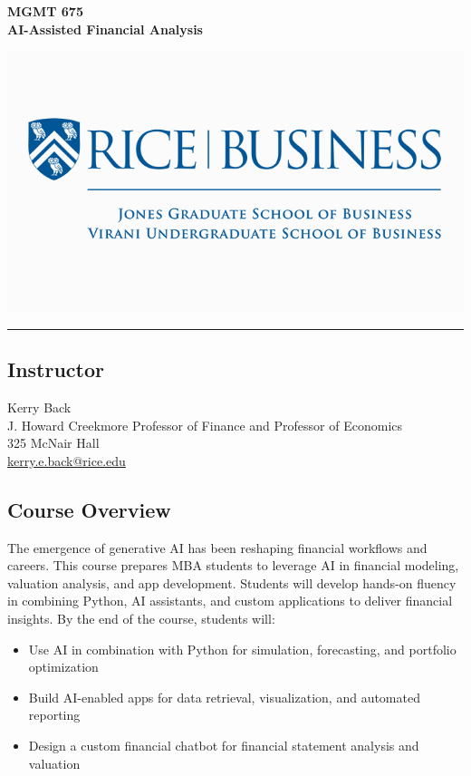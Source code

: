 \documentclass[11pt]{article}
\begin{document}
\begin{minipage}[c][3cm][c]{0.5\textwidth}
\Large\textbf{MGMT 675\\ AI-Assisted Financial Analysis}
\end{minipage}
\hfill
\begin{minipage}[c][3cm][c]{0.4\textwidth}
\includegraphics[width=\textwidth]{images/rice-business.jpg}
\end{minipage}

\vspace{1cm}
\hrule
\subsection*{Instructor}
Kerry Back\\
J. Howard Creekmore Professor of Finance and Professor of Economics\\
325 McNair Hall\\
\href{mailto:kerry.e.back@rice.edu}{kerry.e.back@rice.edu}

\subsection*{Course Overview}

The emergence of generative AI has been reshaping financial workflows and careers. This course prepares MBA students to leverage AI in financial modeling, valuation analysis, and app development. Students will develop hands-on fluency in combining Python, AI assistants, and custom applications to deliver financial insights.  By the end of the course, students will:

\begin{itemize}\setlength{\itemsep}{0pt}
\item Use AI in combination with Python for simulation, forecasting, and portfolio optimization
\item Build AI-enabled apps for data retrieval, visualization, and automated reporting
\item Design a custom financial chatbot for financial statement analysis and valuation
\end{itemize}
\end{document}
